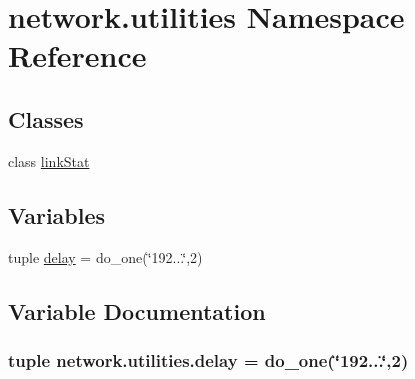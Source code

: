\hypertarget{namespacenetwork_1_1utilities}{}\section{network.\+utilities Namespace Reference}
\label{namespacenetwork_1_1utilities}
\subsection*{Classes}
\begin{DoxyCompactItemize}
\item 
class \hyperlink{classnetwork_1_1utilities_1_1linkStat}{link\+Stat}
\end{DoxyCompactItemize}
\subsection*{Variables}
\begin{DoxyCompactItemize}
\item 
tuple \hyperlink{namespacenetwork_1_1utilities_a17aeca60f6a33113fe34ba4db4d1cedc}{delay} = do\+\_\+one(\char`\"{}192...\char`\"{},2)
\end{DoxyCompactItemize}


\subsection{Variable Documentation}
\hypertarget{namespacenetwork_1_1utilities_a17aeca60f6a33113fe34ba4db4d1cedc}{}
\subsubsection[{delay}]{\setlength{\rightskip}{0pt plus 5cm}tuple network.\+utilities.\+delay = do\+\_\+one(\char`\"{}192...\char`\"{},2)}\label{namespacenetwork_1_1utilities_a17aeca60f6a33113fe34ba4db4d1cedc}
